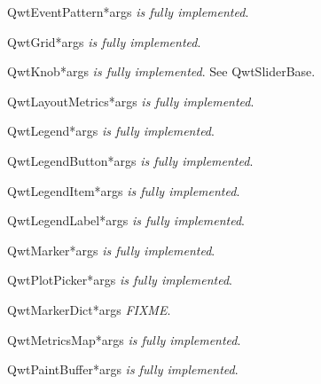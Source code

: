 \documentclass{manual}
\begin{document}
\begin{classdesc}{QwtEventPattern}{*args}
\emph{is fully implemented}.
\end{classdesc}

\begin{classdesc}{QwtGrid}{*args}
\emph{is fully implemented}.
\end{classdesc}

\begin{classdesc}{QwtKnob}{*args}
\emph{is fully implemented}. See QwtSliderBase.
\end{classdesc}

\begin{classdesc}{QwtLayoutMetrics}{*args}
\emph{is fully implemented}.
\end{classdesc}

\begin{classdesc}{QwtLegend}{*args}
\emph{is fully implemented}.
\end{classdesc}

\begin{classdesc}{QwtLegendButton}{*args}
\emph{is fully implemented}.
\end{classdesc}

\begin{classdesc}{QwtLegendItem}{*args}
\emph{is fully implemented}.
\end{classdesc}

\begin{classdesc}{QwtLegendLabel}{*args}
\emph{is fully implemented}.
\end{classdesc}

\begin{classdesc}{QwtMarker}{*args}
\emph{is fully implemented}.
\end{classdesc}

\begin{classdesc}{QwtPlotPicker}{*args}
\emph{is fully implemented}.
\end{classdesc}

\begin{classdesc}{QwtMarkerDict}{*args}
\emph{FIXME}.
\end{classdesc}

\begin{classdesc}{QwtMetricsMap}{*args}
\emph{is fully implemented}.
\end{classdesc}

\begin{classdesc}{QwtPaintBuffer}{*args}
\emph{is fully implemented}.
\end{classdesc}
\end{document}
